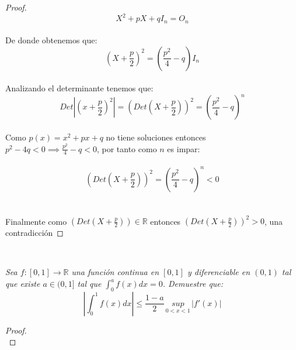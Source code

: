 \documentclass[11pt,letterpaper]{article}
\newcommand{\R}{\mathbb{R}}
\begin{document}
\begin{proof}
\begin{equation*}
        X^2+pX+qI_n=O_n
    \end{equation*}\,\\
    De donde obtenemos que:\,\\
    \begin{equation*}
        \left(X+\frac{p}{2}\right)^2=\left(\frac{p^2}{4}-q\right)I_n
    \end{equation*}\,\\
    Analizando el determinante tenemos que:\,\\
    \begin{equation*}
        Det\left|\left(x+\frac{p}{2}\right)^2\right|=\left(Det\left(X+\frac{p}{2}\right)\right)^2=\left(\frac{p^2}{4}-q\right)^n
    \end{equation*}\,\\
Como $p(x)=x^2+px+q$ no tiene soluciones entonces $p^2-4q<0\implies\frac{p^2}{4}-q<0$, por tanto como $n$ es impar:\,\\
\,\\
\begin{equation*}
    \left(Det\left(X+\frac{p}{2}\right)\right)^2=\left(\frac{p^2}{4}-q\right)^n<0
\end{equation*}\,\\
\,\\
Finalmente como $\left(Det\left(X+\frac{p}{2}\right)\right)\in \R$ entonces $\left(Det\left(X+\frac{p}{2}\right)\right)^2>0$, una contradicci\'on
\end{proof}
\newpage
\,\\
\begin{tcolorbox}[
	title = \textcolor{black}{\textcolor{white}{Problema 5}},]
\textit{Sea $f:[0,1]\rightarrow \R$ una funci\'on continua en $[0,1]$ y diferenciable en $(0,1)$ tal que existe $a\in(0,1]$ tal que
$\int_{0}^a f(x)dx=0$. Demuestre que:\,\\
\begin{equation*}
    \left|\int_{0}^{1}f(x)dx\right|\leq \frac{1-a}{2}\, \underset{0<x<1}{sup}\,|f'(x)|
\end{equation*}
}
\end{tcolorbox}
\begin{proof}\,\\
\end{proof}
\end{document}
